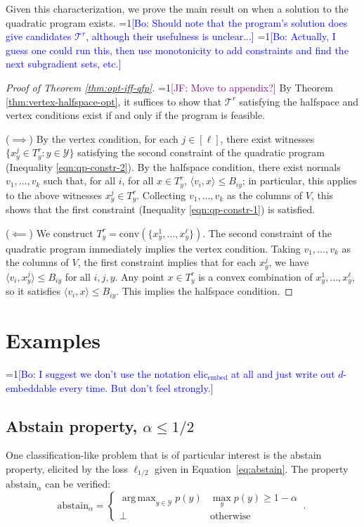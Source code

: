 \documentclass[anon]{colt2020} %
\newcommand{\Comments}{1}
\newcommand{\mynote}[2]{\ifnum\Comments=1\textcolor{#1}{#2}\fi}
\newcommand{\jessie}[1]{\mynote{purple}{[JF: #1]}}
\newcommand{\bo}[1]{\mynote{blue}{[Bo: #1]}}
\newcommand{\elicembed}{\mathrm{elic}_\mathrm{embed}}
\newcommand{\abstain}[1]{\mathrm{abstain}_{#1}}
\newcommand{\T}{\mathcal{T}}
\newcommand{\Y}{\mathcal{Y}}
\newcommand{\ellabs}[1]{\ell_{#1}}
\newcommand{\inprod}[2]{\langle #1, #2 \rangle}%
\newcommand{\conv}{\mathrm{conv}}
\DeclareMathOperator*{\argmax}{arg\,max}
\begin{document}
Given this characterization, we prove the main result on when a solution to the quadratic program exists.
\bo{Should note that the program's solution does give candidates $\T^r$, although their usefulness is unclear...}
\bo{Actually, I guess one could run this, then use monotonicity to add constraints and find the next subgradient sets, etc.}

\begin{proof}[Proof of Theorem \ref{thm:opt-iff-qfp}]
	\jessie{Move to appendix?}
    By Theorem \ref{thm:vertex-halfspace-opt}, it suffices to show that $\T^r$ satisfying the halfspace and vertex conditions exist if and only if the program is feasible.

  ($\implies$)
  By the vertex condition, for each $j \in [\ell]$, there exist witnesses $\{x^j_y \in T^r_y : y \in \Y\}$ satisfying the second constraint of the quadratic program (Inequality \ref{eqn:qp-constr-2}).
  By the halfspace condition, there exist normals $v_1, \dots, v_k$ such that, for all $i$, for all $x \in T^r_y$, $\inprod{v_i}{x} \leq B_{iy}$; in particular, this applies to the above witnesses $x^j_y \in T^r_y$.
  Collecting $v_1,\dots,v_k$ as the columns of $V$, this shows that the first constraint (Inequality \ref{eqn:qp-constr-1}) is satisfied.

  \bigskip
  ($\impliedby$)
  We construct $T^r_y = \conv(\{x^1_y, \ldots, x^{\ell}_y\})$.
  The second constraint of the quadratic program immediately implies the vertex condition.
  Taking $v_1,\dots,v_k$ as the columns of $V$, the first constraint implies that for each $x^j_y$, we have $\inprod{v_i}{x^j_y} \leq B_{iy}$ for all $i,j,y$.
  Any point $x \in T^r_y$ is a convex combination of $x^1_y,\ldots,x^{\ell}_y$, so it satisfies $\inprod{v_i}{x} \leq B_{iy}$.
  This implies the halfspace condition.  %
\end{proof}




\section{Examples}\label{sec:examples}
\bo{I suggest we don't use the notation $\elicembed$ at all and just write out $d$-embeddable every time. But don't feel strongly.}
\subsection{Abstain property, $\alpha \leq 1/2$}\label{subsec:example-abstain}
One classification-like problem that is of particular interest is the abstain property, elicited by the loss $\ellabs{1/2}$ given in Equation~\ref{eq:abstain}.
The property $\abstain{\alpha}$ can be verified:
\begin{equation}\label{eq:abstain-prop}
     \abstain{\alpha} = \begin{cases}
     \argmax_{y \in \Y} p(y) & \max_y p(y) \geq 1 - \alpha\\
     \bot & \text{otherwise}
     \end{cases}~.~
\end{equation}
\end{document}

